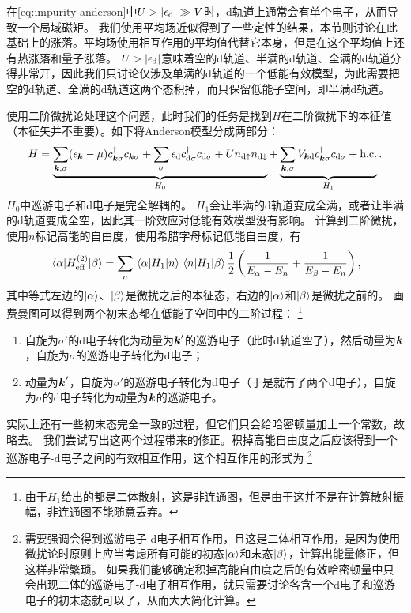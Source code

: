 在\eqref{eq:impurity-anderson}中$U > \abs{\epsilon_\text{d}} \gg V$时，d轨道上通常会有单个电子，从而导致一个局域磁矩。
我们使用平均场近似得到了一些定性的结果，本节则讨论在此基础上的涨落。平均场使用相互作用的平均值代替它本身，但是在这个平均值上还有热涨落和量子涨落。
$U > \abs{\epsilon_\text{d}}$意味着空的d轨道、半满的d轨道、全满的d轨道分得非常开，因此我们只讨论仅涉及单满的d轨道的一个低能有效模型，为此需要把空的d轨道、全满的d轨道这两个态积掉，而只保留低能子空间，即半满d轨道。

使用二阶微扰论处理这个问题，此时我们的任务是找到${H}$在二阶微扰下的本征值（本征矢并不重要）。如下将Anderson模型分成两部分：
\[
    {H} = \underbrace{\sum_{\vb*{k}, \sigma} (\epsilon_{\vb*{k}} - \mu) {c}_{\vb*{k}\sigma}^\dagger {c}_{\vb*{k} \sigma} + \sum_\sigma \epsilon_\text{d} {c}_{\text{d}\sigma}^\dagger {c}_{\text{d} \sigma} + U {n}_{\text{d} \uparrow} {n}_{\text{d} \downarrow}}_{{H}_0} + \underbrace{\sum_{\vb*{k}, \sigma} V_{\vb*{k} \text{d}} {c}_{\vb*{k} \sigma}^\dagger {c}_{\text{d} \sigma} + \text{h.c.}}_{{H}_1}.
\]
${H}_0$中巡游电子和d电子是完全解耦的。
${H}_1$会让半满的d轨道变成全满，或者让半满的d轨道变成全空，因此其一阶效应对低能有效模型没有影响。
计算到二阶微扰，使用$n$标记高能的自由度，使用希腊字母标记低能自由度，有
\[
    \mel{\alpha}{{H}_\text{eff}^{(2)}}{\beta} = \sum_n \mel{\alpha}{{H}_1}{n} \mel{n}{{H}_1}{\beta} \frac{1}{2} \left( \frac{1}{E_\alpha - E_n} + \frac{1}{E_\beta - E_n} \right),
\]
其中等式左边的$\ket{\alpha}$、$\ket{\beta}$是微扰之后的本征态，右边的$\ket{\alpha}$和$\ket{\beta}$是微扰之前的。
画费曼图可以得到两个初末态都在低能子空间中的二阶过程：%
\footnote{由于${H}_1$给出的都是二体散射，这是非连通图，但是由于这并不是在计算散射振幅，非连通图不能随意丢弃。}%
\begin{enumerate}
    \item 自旋为$\sigma'$的d电子转化为动量为$\vb*{k}'$的巡游电子（此时d轨道空了），然后动量为$\vb*{k}$，自旋为$\sigma$的巡游电子转化为d电子；
    \item 动量为$\vb*{k}'$，自旋为$\sigma'$的巡游电子转化为d电子（于是就有了两个d电子），自旋为$\sigma$的d电子转化为动量为$\vb*{k}$的巡游电子。
\end{enumerate}
实际上还有一些初末态完全一致的过程，但它们只会给哈密顿量加上一个常数，故略去。
我们尝试写出这两个过程带来的修正。积掉高能自由度之后应该得到一个巡游电子-d电子之间的有效相互作用，这个相互作用的形式为%
\footnote{需要强调会得到巡游电子-d电子相互作用，且这是二体相互作用，是因为使用微扰论时原则上应当考虑所有可能的初态$\ket{\alpha}$和末态$\ket{\beta}$，计算出能量修正，但这样非常繁琐。
如果我们能够确定积掉高能自由度之后的有效哈密顿量中只会出现二体的巡游电子-d电子相互作用，就只需要讨论各含一个d电子和巡游电子的初末态就可以了，从而大大简化计算。
}%
